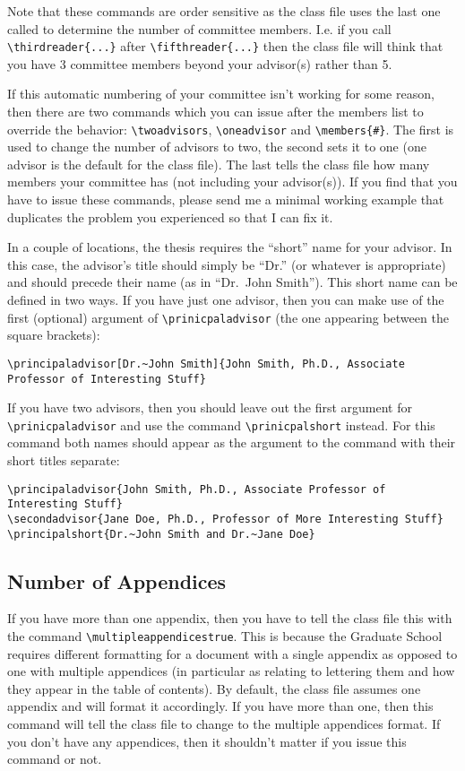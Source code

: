 Note that these commands are order sensitive as the class file uses the last one called to determine the number of committee members.  I.e. if you call \verb=\thirdreader{...}= after \verb=\fifthreader{...}= then the class file will think that you have 3 committee members beyond your advisor(s) rather than 5.

If this automatic numbering of your committee isn't working for some reason, then there are two commands which you can issue after the members list to override the behavior: \verb=\twoadvisors=, \verb=\oneadvisor= and \verb=\members{#}=.  The first is used to change the number of advisors to two, the second sets it to one (one advisor is the default for the class file).  The last tells the class file how many members your committee has (not including your advisor(s)).  If you find that you have to issue these commands, please send me a minimal working example that duplicates the problem you experienced so that I can fix it.

In a couple of locations, the thesis requires the ``short'' name for your advisor.  In this case, the advisor's title should simply be ``Dr.'' (or whatever is appropriate) and should precede their name (as in ``Dr.~John Smith'').  This short name can be defined in two ways.  If you have just one advisor, then you can make use of the first (optional) argument of \verb=\prinicpaladvisor= (the one appearing between the square brackets):

\begin{verbatim}
\principaladvisor[Dr.~John Smith]{John Smith, Ph.D., Associate Professor of Interesting Stuff}
\end{verbatim}

If you have two advisors, then you should leave out the first argument for \verb=\prinicpaladvisor= and use the command \verb=\prinicpalshort= instead.  For this command both names should appear as the argument to the command with their short titles separate:

\begin{verbatim}
\principaladvisor{John Smith, Ph.D., Associate Professor of Interesting Stuff}
\secondadvisor{Jane Doe, Ph.D., Professor of More Interesting Stuff}
\principalshort{Dr.~John Smith and Dr.~Jane Doe}
\end{verbatim}

\subsection{Number of Appendices}
If you have more than one appendix, then you have to tell the class file this with the command \verb=\multipleappendicestrue=.  This is because the Graduate School requires different formatting for a document with a single appendix as opposed to one with multiple appendices (in particular as relating to lettering them and how they appear in the table of contents).  By default, the class file assumes one appendix and will format it accordingly.  If you have more than one, then this command will tell the class file to change to the multiple appendices format.  If you don't have any appendices, then it shouldn't matter if you issue this command or not.

